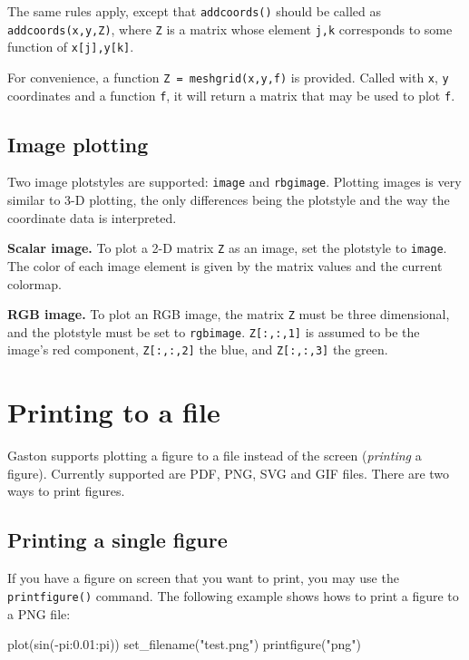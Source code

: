 \documentclass[11pt]{article}
\newcommand{\cmd}[1]{\texttt{#1}}
\begin{document}
The same rules apply, except that \cmd{addcoords()} should be called as
\cmd{addcoords(x,y,Z)}, where \cmd{Z} is a matrix whose element \cmd{j,k}
corresponds to some function of \cmd{x[j],y[k]}.

For convenience, a function \cmd{Z = meshgrid(x,y,f)} is provided. Called with
\cmd{x}, \cmd{y} coordinates and a function \cmd{f}, it will return a matrix
that may be used to plot \cmd{f}.

\subsection{Image plotting}

Two image plotstyles are supported: \cmd{image} and \cmd{rbgimage}. Plotting
images is very similar to 3-D plotting, the only differences being the
plotstyle and the way the coordinate data is interpreted.

\textbf{Scalar image.} To plot a 2-D matrix \cmd{Z} as an image, set the
plotstyle to \cmd{image}. The color of each image element is given by the
matrix values and the current colormap.

\textbf{RGB image.} To plot an RGB image, the matrix \cmd{Z} must be three
dimensional, and the plotstyle must be set to \cmd{rgbimage}.  \cmd{Z[:,:,1]}
is assumed to be the image's red component, \cmd{Z[:,:,2]} the blue, and
\cmd{Z[:,:,3]} the green.

\section{Printing to a file}
\label{s:print}

Gaston supports plotting a figure to a file instead of the screen
(\textit{printing} a figure). Currently supported are PDF, PNG,  SVG and GIF
files. There are two ways to print figures.

\subsection{Printing a single figure}

If you have a figure on screen that you want to print, you may use the
\cmd{printfigure()} command. The following example shows hows to print a figure
to a PNG file:

\begin{juliacode}
plot(sin(-pi:0.01:pi))
set_filename("test.png")
printfigure("png")
\end{juliacode}
\end{document}
